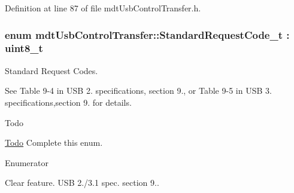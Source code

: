 Definition at line 87 of file mdt\-Usb\-Control\-Transfer.\-h.

\hypertarget{classmdt_usb_control_transfer_a9a13f68d5d4998dd8564c4e4c6278c77}{
\subsubsection[{Standard\-Request\-Code\-\_\-t}]{\setlength{\rightskip}{0pt plus 5cm}enum {\bf mdt\-Usb\-Control\-Transfer\-::\-Standard\-Request\-Code\-\_\-t} \-: uint8\-\_\-t\hspace{0.3cm}{\ttfamily [strong]}}}\label{classmdt_usb_control_transfer_a9a13f68d5d4998dd8564c4e4c6278c77}


Standard Request Codes. 

See Table 9-\/4 in U\-S\-B 2. specifications, section 9., or Table 9-\/5 in U\-S\-B 3. specifications,section 9. for details.

\begin{DoxyRefDesc}{Todo}
\item[\hyperlink{todo__todo000037}{Todo}]Complete this enum. \end{DoxyRefDesc}
\begin{Desc}
\item[Enumerator]\par
\begin{description}
\item[{\em 
\hypertarget{classmdt_usb_control_transfer_a9a13f68d5d4998dd8564c4e4c6278c77a055987b2a1850b3a8f19befda5ea79ab}{G\-E\-T\-\_\-\-S\-T\-A\-T\-U\-S}\label{classmdt_usb_control_transfer_a9a13f68d5d4998dd8564c4e4c6278c77a055987b2a1850b3a8f19befda5ea79ab}
}]\item[{\em 
\hypertarget{classmdt_usb_control_transfer_a9a13f68d5d4998dd8564c4e4c6278c77aba7daed095c1e4f1dc05e56562a04c81}{C\-L\-E\-A\-R\-\_\-\-F\-E\-A\-T\-U\-R\-E}\label{classmdt_usb_control_transfer_a9a13f68d5d4998dd8564c4e4c6278c77aba7daed095c1e4f1dc05e56562a04c81}
}]Clear feature. U\-S\-B 2./3.1 spec. section 9.. \end{description}
\end{Desc}


